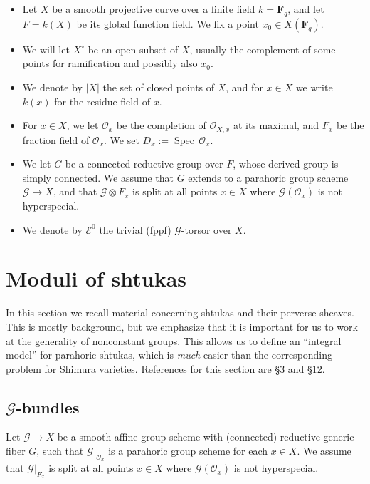 \documentclass[reqno]{amsart}
\numberwithin{equation}{section}
\newcommand{\F}{\mathbf{F}}
\newcommand{\Cal}[1]{\mathcal{#1}}
\newcommand{\cX}{X^{\circ}}
\DeclareMathOperator{\Spec}{Spec\,}
\theoremstyle{remark}
\numberwithin{equation}{section}
\begin{document}
\begin{itemize}
\item Let $X$ be a smooth projective curve over a finite field $k=\F_q$, and let $F=k(X)$ be its global function field. We fix a point $x_0\in X(\F_{q})$.
\item We will let $\cX$ be an open subset of $X$, usually the complement of some points for ramification and possibly also $x_0$.
\item We denote by $|X|$ the set of closed points of $X$, and for $x\in X$ we write $k(x)$ for the residue field of $x$. 
\item For $x \in X$, we let $\Cal{O}_x$  be the completion of $\Cal{O}_{X,x}$ at its maximal, and $F_x$ be the fraction field of $\Cal{O}_x$. We set $D_x := \Spec \Cal{O}_x$.
\item We let $G$ be a connected reductive group over $F$, whose derived group is simply connected. We assume that $G$ extends to a parahoric group scheme $\Cal{G} \rightarrow X$, and that $\Cal{G} \otimes F_x$ is split at all points $x \in X$ where $\Cal{G}(\Cal{O}_x)$ is not hyperspecial. 
\item We denote by $\Cal{E}^0$ the trivial (fppf) $\Cal{G}$-torsor over $X$. 	
\end{itemize}


\section{Moduli of shtukas}\label{shtukas background}

In this section we recall material concerning shtukas and their perverse sheaves. This is mostly background, but we emphasize that it is important for us to work at the generality of nonconstant groups. This allows us to define an ``integral model'' for parahoric shtukas, which is \emph{much} easier than the corresponding problem for Shimura varieties. References for this section are \cite{Zhu14} \S 3 and  \cite{Laff12} \S  12.

\subsection{$\Cal{G}$-bundles}\label{subsec: G-bundles}

Let $\Cal{G} \rightarrow X$ be a smooth affine group scheme with (connected) reductive generic fiber $G$, such that $\Cal{G}|_{\Cal{O}_{x}}$ is a parahoric group scheme for each $x \in X$. We assume that $\Cal{G}|_{ F_x}$ is split at all points $x \in X$ where $\Cal{G}(\Cal{O}_x)$ is not hyperspecial.
\end{document}

